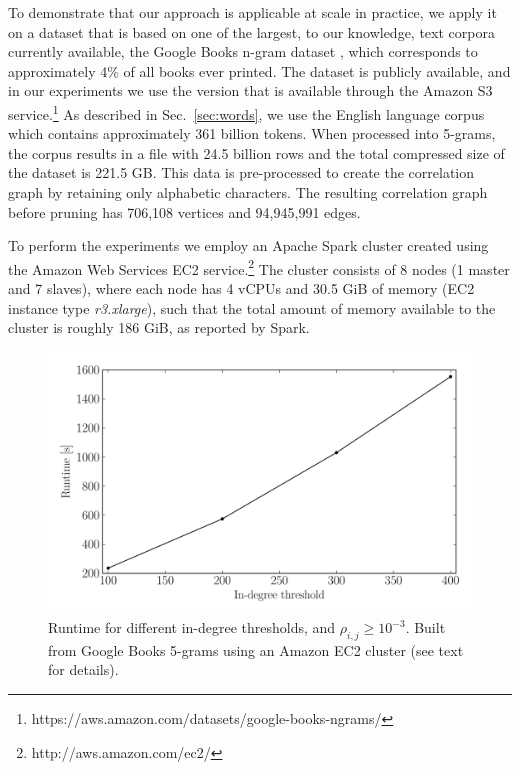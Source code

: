 \documentclass{kais}
\newcommand{\rn}[1]{\rho_{#1}}
\begin{document}
To demonstrate that our approach is applicable at scale in practice, we apply it on a dataset that is based on 
one of the largest, to our knowledge, text corpora currently available, the Google Books
n-gram dataset \cite{Michel10,Lin12}, which corresponds to approximately 4\% of all books ever printed.
The dataset is publicly available, and in our experiments we use
the version that is available through the Amazon S3 service.\footnote{https://aws.amazon.com/datasets/google-books-ngrams/}
As described in Sec.\ \ref{sec:words}, we use the English language corpus
which contains approximately 361 billion tokens. When processed into 5-grams, the corpus results in a file with 24.5 billion 
rows and the total compressed size of the dataset is 221.5 GB. This data is pre-processed to create the correlation graph by retaining
only alphabetic characters. The resulting correlation graph before pruning has 706,108 vertices and 94,945,991 edges.

To perform the experiments we employ an Apache Spark cluster created using the Amazon
Web Services EC2 service.\footnote{http://aws.amazon.com/ec2/}
The cluster consists of 8 nodes (1 master and 7 slaves), where each node has 4 vCPUs and
30.5 GiB of memory (EC2 instance type \emph{r3.xlarge}), such that the total amount of memory available to the cluster
is roughly 186 GiB, as reported by Spark.

\begin{figure}
\centerline{\includegraphics[width=0.75\columnwidth]{figures/eng-all-edge-low-e3-vtx-low-e8-high-e1-100-400-idg-nt.pdf}}
\caption{Runtime for different in-degree 
thresholds, and $\rn{i,j} \geq 10^{-3}$. Built from Google Books 5-grams using an Amazon
EC2 cluster (see text for details).}
\label{fig:google-e-runtime}
\end{figure}
\end{document}
